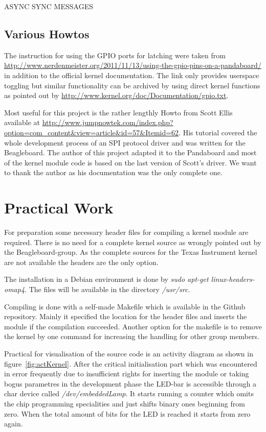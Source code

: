 ASYNC SYNC MESSAGES

\subsection{Various Howtos}

The instruction for using the GPIO ports for latching were taken from
\url{http://www.nerdenmeister.org/2011/11/13/using-the-gpio-pins-on-a-pandaboard/} in addition to the official kernel documentation.
The link only provides userspace toggling but similar functionality can be archived by using direct kernel functions as pointed out 
by \url{http://www.kernel.org/doc/Documentation/gpio.txt}.

Most useful for this project is the rather lengthly Howto from Scott Ellis available at \url{http://www.jumpnowtek.com/index.php?option=com\_content&view=article&id=57&Itemid=62}. His tutorial covered the whole development process of an SPI protocol driver and was 
written for the Beagleboard. The author of this project adapted it to the Pandaboard and most of the kernel module code is based on the last
version of Scott's driver. We want to thank the author as his documentation was the only complete one.

\section{Practical Work}

For preparation some necessary header files for compiling a kernel module are required. There is no need for a complete kernel source as 
wrongly pointed out by the Beagleboard-group. As the complete sources for the Texas Instrument kernel are not available the headers 
are the only option. 

The installation in a Debian environment is done by \textsl{sudo apt-get linux-headers-omap4}. The files will be available in the 
directory \textsl{/usr/src}.

Compiling is done with a self-made Makefile which is available in the Github repository. Mainly it specified the location for the header files
and inserts the module if the compilation succeeded. Another option for the makefile is to remove the kernel by one command for increasing 
the handling for other group members.

Practical for visualisation of the source code is an activity diagram as shown in figure~\ref{fig:actKernel}. After the critical 
initialisation part which was encountered in error frequently due to insufficient rights for inserting the module or taking bogus parametres
in the development phase the LED-bar is accessible through a char device called \textsl{/dev/embeddedLamp}. It starts running a counter 
which omits the chip programming specialities and just shifts binary ones beginning from zero. When the total amount of bits for the 
LED is reached it starts from zero again.

